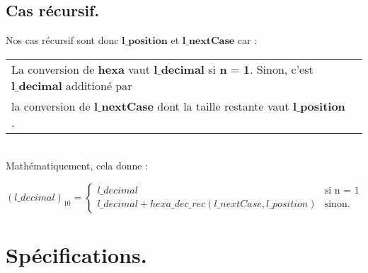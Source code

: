 \documentclass[a4paper, 11pt, oneside]{article}
\begin{document}
	\subsection{Cas récursif.}\label{cas_recur}
	
		Nos cas récursif sont donc $\textbf{l\_position}$ et $\textbf{l\_nextCase}$ car :
		\\
		
		\begin{tabular}{|p{15cm}|c}
			\hline
			La conversion de $\textbf{hexa}$ vaut $\textbf{l\_decimal}$ si $\textbf{n = 1}$. Sinon, c'est $\textbf{l\_decimal}$ additioné par 
			\\ la conversion de $\textbf{l\_nextCase}$ dont la taille restante vaut $\textbf{l\_position}$.
			\\
			\hline
		\end{tabular}
		\\
		
		Mathématiquement, cela donne :
		\vspace{2mm}
		
			$
			(l\_decimal)_{10} = \left\{
	    	\begin{array}{ll}
	        		l\_decimal & \mbox{si n = 1}  \\
	        		l\_decimal + hexa\_dec\_rec(l\_nextCase, l\_position) & \mbox{sinon.}
	    	\end{array}
			\right.
			$
		
\section{Spécifications.}\label{specification}
\end{document}
